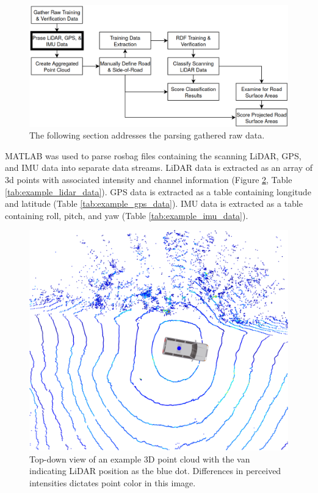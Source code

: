 \documentclass[numbered,pdftex]{ohio-etd}
\begin{document}
{{		\begin{figure}[H]
			\centering
			\includegraphics[width=0.9\linewidth]{Defense_Images/flowz_parse_data}
			\caption[Training Data Parsing Flowchart Context]{The following section addresses the parsing gathered raw data.}
			\label{fig:flowz_parse_data}
		\end{figure}
		
		{MATLAB was used to parse rosbag files containing the scanning LiDAR, GPS, and IMU data into separate data streams. LiDAR data is extracted as an array of 3d points with associated intensity and channel information (Figure \ref{fig:pcd_example}, Table \ref{tab:example_lidar_data}). GPS data is extracted as a table containing longitude and latitude (Table \ref{tab:example_gps_data}). IMU data is extracted as a table containing roll, pitch, and yaw (Table \ref{tab:example_imu_data}).}
		
		
		
		\begin{figure}[H]
			\centering
			\includegraphics[width=0.95\linewidth]{Defense_Images/pcd_example_with_van}
			\caption[Example Point Cloud]{Top-down view of an example 3D point cloud with the van indicating LiDAR position as the blue dot. Differences in perceived intensities dictates point color in this image.}
			\label{fig:pcd_example}
		\end{figure}
		
}}
\end{document}
